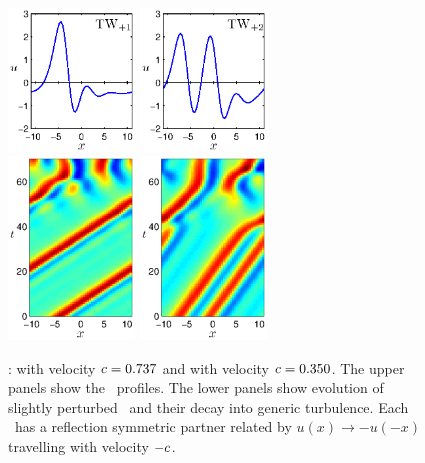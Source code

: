 \begin{figure}[t]
\begin{center}
\includegraphics[width=0.3\textwidth, clip=true]{figs/ks22_TW1_profile.eps}
\includegraphics[width=0.3\textwidth, clip=true]{figs/ks22_TW2_profile.eps}\\
\includegraphics[width=0.3\textwidth, clip=true]{figs/ks22_TW1_orbit_c.eps}
\includegraphics[width=0.3\textwidth, clip=true]{figs/ks22_TW2_orbit_c.eps}
\end{center}
\caption{
\Reqva :  with velocity $c = 0.737$ and  with
velocity $c = 0.350$.
The upper panels show the \reqva\ profiles.  The lower panels show
evolution of slightly perturbed \reqva\ and their decay into generic
turbulence. Each \reqv\ has a reflection symmetric partner related by
$u(x) \to -u(-x)$ travelling with velocity $-c$.
} \label{f:ks22TW}
\end{figure}

